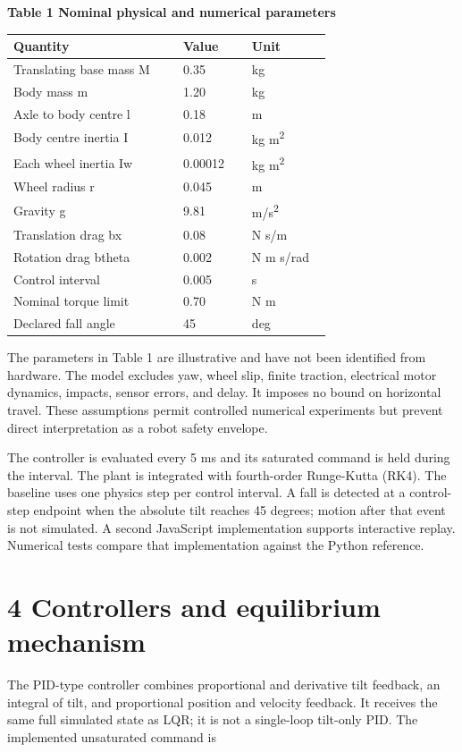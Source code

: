 \documentclass[11pt,a4paper]{article}
\begin{document}
\textbf{Table 1 Nominal physical and numerical parameters}
\begin{longtable}{p{0.477\linewidth}p{0.198\linewidth}p{0.225\linewidth}}
\toprule
Quantity & Value & Unit \\ \midrule \endhead
Translating base mass M & 0.35 & kg \\
Body mass m & 1.20 & kg \\
Axle to body centre l & 0.18 & m \\
Body centre inertia I & 0.012 & kg m\textsuperscript{2} \\
Each wheel inertia Iw & 0.00012 & kg m\textsuperscript{2} \\
Wheel radius r & 0.045 & m \\
Gravity g & 9.81 & m/s\textsuperscript{2} \\
Translation drag bx & 0.08 & N s/m \\
Rotation drag btheta & 0.002 & N m s/rad \\
Control interval & 0.005 & s \\
Nominal torque limit & 0.70 & N m \\
Declared fall angle & 45 & deg \\
\bottomrule
\end{longtable}
The parameters in Table 1 are illustrative and have not been identified from hardware. The model excludes yaw, wheel slip, finite traction, electrical motor dynamics, impacts, sensor errors, and delay. It imposes no bound on horizontal travel. These assumptions permit controlled numerical experiments but prevent direct interpretation as a robot safety envelope.

The controller is evaluated every 5 ms and its saturated command is held during the interval. The plant is integrated with fourth-order Runge-Kutta (RK4). The baseline uses one physics step per control interval. A fall is detected at a control-step endpoint when the absolute tilt reaches 45 degrees; motion after that event is not simulated. A second JavaScript implementation supports interactive replay. Numerical tests compare that implementation against the Python reference.

\section*{4 Controllers and equilibrium mechanism}
The PID-type controller combines proportional and derivative tilt feedback, an integral of tilt, and proportional position and velocity feedback. It receives the same full simulated state as LQR; it is not a single-loop tilt-only PID. The implemented unsaturated command is
\end{document}
